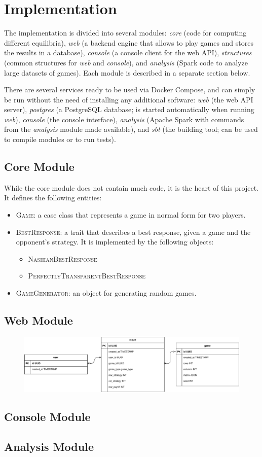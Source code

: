 \chapter{Implementation}
The implementation is divided into several modules: \textit{core} (code for computing different equilibria), \textit{web} (a backend engine that allows to play games and stores the results in a database), \textit{console} (a console client for the web API), \textit{structures} (common structures for \textit{web} and \textit{console}), and \textit{analysis} (Spark code to analyze large datasets of games).
Each module is described in a separate section below.

There are several services ready to be used via Docker Compose, and can simply be run without the need of installing any additional software:
\textit{web} (the web API server), \textit{postgres} (a PostgreSQL database; is started automatically when running \textit{web}), \textit{console} (the console interface), \textit{analysis} (Apache Spark with commands from the \textit{analysis} module made available), and \textit{sbt} (the building tool; can be used to compile modules or to run tests).

\section{Core Module}
While the core module does not contain much code, it is the heart of this project.
It defines the following entities:
\begin{itemize}
	\item \textsc{Game}: a case class that represents a game in normal form for two players.
	\item \textsc{BestResponse}: a trait that describes a best response, given a game and the opponent's strategy.
	It is implemented by the following objects:
	\begin{itemize}
		\item \textsc{NashianBestResponse}
		\item \textsc{PerfectlyTransparentBestResponse}
	\end{itemize}
	\item \textsc{GameGenerator}: an object for generating random games.
\end{itemize}

\section{Web Module}
\begin{figure}
	\hspace{-1cm}
	\includegraphics[width=14cm]{fig/schema.pdf}
\end{figure}

\section{Console Module}

\section{Analysis Module}
